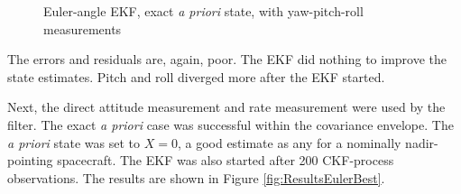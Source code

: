 \documentclass[]{aiaa-tc}%
\begin{document}
\begin{figure}[H]
{		}
		\caption{Euler-angle EKF, exact \textit{a priori} state, with yaw-pitch-roll measurements }
		\label{fig:ResultsEulerAPExact_ypr}
	\end{figure}	

The errors and residuals are, again, poor. The EKF did nothing to improve the state estimates. Pitch and roll diverged more after the EKF started.

	\vspace{5 mm}

Next, the direct attitude measurement and rate measurement were used by the filter. The exact \textit{a priori} case was successful within the covariance envelope. The \textit{a priori} state was set to $X=0$, a good estimate as any for a nominally nadir-pointing spacecraft. The EKF was also started after 200 CKF-process observations. The results are shown in Figure \ref{fig:ResultsEulerBest}.
\end{document}
